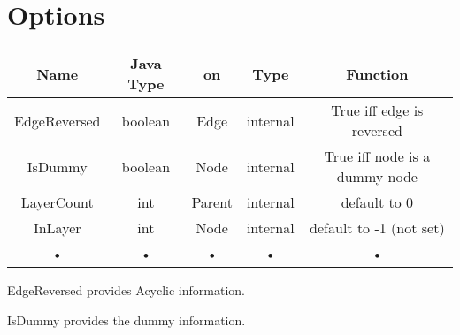 \section{Options}


\begin{center}
\begin{tabular}{|c|c|c|c|c|}
\hline 
Name & Java Type & on & Type & Function \\ 
\hline 
EdgeReversed & boolean & Edge & internal & True iff edge is reversed \\ 
\hline 
IsDummy & boolean & Node & internal & True iff node is a dummy node \\ 
\hline 
LayerCount & int & Parent & internal & default to 0 \\ 
\hline 
InLayer & int & Node & internal & default to -1 (not set) \\ 
\hline 
• & • & • & • & • \\ 
\hline 
\end{tabular} 
\end{center}

EdgeReversed provides Acyclic information.

IsDummy provides the dummy information.